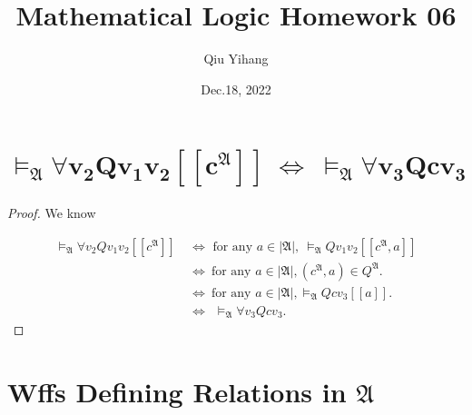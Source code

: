 \documentclass{article}
\title{\textbf{Mathematical Logic Homework 06}}
\author{Qiu Yihang}
\date{Dec.18, 2022}
\begin{document}
\maketitle

\vspace{3em}
\section{$\boldsymbol{\vDash_{\mathfrak{A}}\forall v_2Qv_1v_2[\![c^{\mathfrak{A}}]\!]\ \Longleftrightarrow\ \vDash_{\mathfrak{A}}\forall v_3Qcv_3}$}
\vspace{1em}
\begin{proof}
    We know

    \vspace{-3.em}
    \begin{align*}
    \vDash_{\mathfrak{A}}\forall v_2Qv_1v_2[\![c^{\mathfrak{A}}]\!]\  &\Longleftrightarrow\text{ for any }a\in|\mathfrak{A}|,\ \vDash_{\mathfrak{A}} Qv_1v_2[\![c^{\mathfrak{A}}, a]\!] \\
    & \Longleftrightarrow\ \text{for any }a\in|\mathfrak{A}|, \left(c^{\mathfrak{A}},a\right)\in Q^{\mathfrak{A}}. \\
    & \Longleftrightarrow\ \text{for any }a\in|\mathfrak{A}|, \vDash_\mathfrak{A} Qcv_3[\![a]\!]. \\
    & \Longleftrightarrow\ \ \vDash_{\mathfrak{A}}\forall v_3Qcv_3.
    \end{align*}

    \vspace{-3.3em}
\end{proof}

\vspace{1em}
\section{Wffs Defining Relations in $\boldsymbol{\mathfrak{A}}$}
\vspace{1em}
\end{document}
